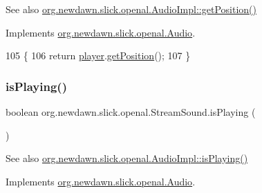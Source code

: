 \begin{DoxySeeAlso}{See also}
\mbox{\hyperlink{classorg_1_1newdawn_1_1slick_1_1openal_1_1_audio_impl_a71aa3ed24fc3e7e4e8603b89250b35bd}{org.\+newdawn.\+slick.\+openal.\+Audio\+Impl\+::get\+Position()}} 
\end{DoxySeeAlso}


Implements \mbox{\hyperlink{interfaceorg_1_1newdawn_1_1slick_1_1openal_1_1_audio_aa838b5606c0aa5f23dd46ac5918bb717}{org.\+newdawn.\+slick.\+openal.\+Audio}}.


\begin{DoxyCode}
105                                \{
106         \textcolor{keywordflow}{return} \mbox{\hyperlink{classorg_1_1newdawn_1_1slick_1_1openal_1_1_stream_sound_a5e4d0d6e22af804ce94996f6ab90872f}{player}}.\mbox{\hyperlink{classorg_1_1newdawn_1_1slick_1_1openal_1_1_open_a_l_stream_player_a9abaf98266809fa03b92f42744a3d332}{getPosition}}();
107     \}
\end{DoxyCode}
\mbox{\label{classorg_1_1newdawn_1_1slick_1_1openal_1_1_stream_sound_a286c8ab056d5b6715e5e3155c3e91508}} 
\subsubsection{\texorpdfstring{is\+Playing()}{isPlaying()}}
{\footnotesize\ttfamily boolean org.\+newdawn.\+slick.\+openal.\+Stream\+Sound.\+is\+Playing (\begin{DoxyParamCaption}{ }\end{DoxyParamCaption})\hspace{0.3cm}{\ttfamily [inline]}}

\begin{DoxySeeAlso}{See also}
\mbox{\hyperlink{classorg_1_1newdawn_1_1slick_1_1openal_1_1_audio_impl_a842212ec52d43824dee1d7c6e7fa4ce1}{org.\+newdawn.\+slick.\+openal.\+Audio\+Impl\+::is\+Playing()}} 
\end{DoxySeeAlso}


Implements \mbox{\hyperlink{interfaceorg_1_1newdawn_1_1slick_1_1openal_1_1_audio_a842b49128a58be8c4473cbcc8ee4ad9e}{org.\+newdawn.\+slick.\+openal.\+Audio}}.


